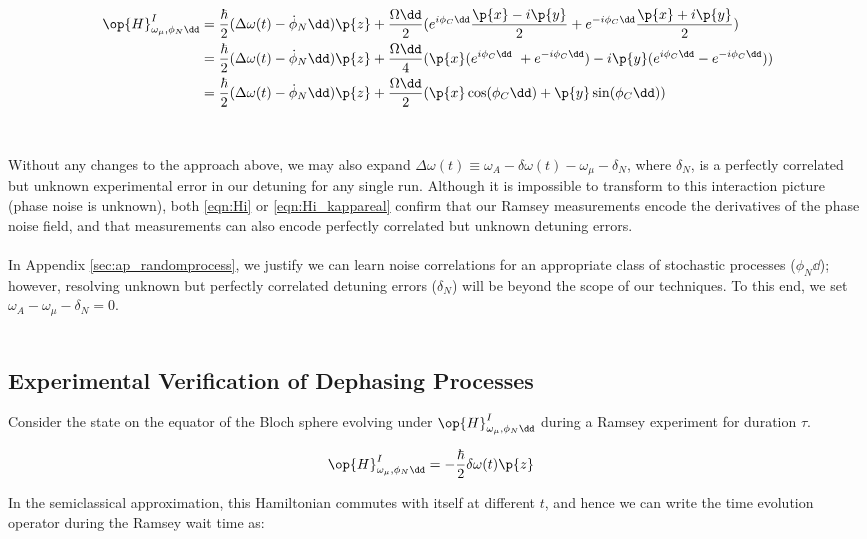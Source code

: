\begin{align}
\op{H}^{I}_{\omega_\mu,\phi_N\dd} & = \frac{\hbar}{2}(\Delta \omega(t)- \dot{\phi}_N\dd)\p{z} + \frac{\Omega\dd}{2} (e^{i\phi_C\dd}\frac{\p{x} - i\p{y}}{2} + e^{-i\phi_C\dd}\frac{\p{x} + i\p{y}}{2})\\
& = \frac{\hbar}{2}(\Delta \omega(t)- \dot{\phi}_N\dd)\p{z} + \frac{\Omega\dd}{4} (\p{x} (e^{i\phi_C\dd}\ +  e^{-i\phi_C\dd})- i\p{y} ( e^{i\phi_C\dd} - e^{-i\phi_C\dd} ))\\
& = \frac{\hbar}{2}(\Delta \omega(t)- \dot{\phi}_N\dd)\p{z} + \frac{\Omega\dd}{2} (\p{x} \cos(\phi_C\dd) + \p{y} \sin(\phi_C\dd)) \label{eqn:Hi_kappareal}
\end{align}
\\
\\
Without any changes to the approach above, we may also expand $\Delta \omega(t) \equiv \omega_A - \delta \omega(t)-\omega_\mu -\delta_N$, where $\delta_N$, is a perfectly correlated but unknown experimental error in our detuning for any single run. Although it is impossible to transform to this interaction picture (phase noise is unknown), both \ref{eqn:Hi} or \ref{eqn:Hi_kappareal} confirm that our Ramsey measurements encode the derivatives of the phase noise field, and that measurements can also encode perfectly correlated but unknown detuning errors.
\\
\\
In Appendix \ref{sec:ap_randomprocess}, we justify we can learn noise correlations for an appropriate class of stochastic processes ($\phi_N\dd$); however, resolving unknown but perfectly correlated detuning errors ($\delta_N$) will be beyond the scope of our techniques. To this end, we set $\omega_A - \omega_\mu - \delta_N = 0$.
\\
\\
\subsection{Experimental Verification of Dephasing Processes} \label{sec:ap_setup:subsec:RamseyMeasurement}

Consider the state on the equator of the Bloch sphere evolving under $\op{H}^{I}_{\omega_\mu,\phi_N\dd}$ during a Ramsey experiment for duration $\tau$. 

\begin{align}
\op{H}^{I}_{\omega_\mu,\phi_N\dd} & = -\frac{\hbar}{2}\delta\omega(t)\p{z}
\end{align}

In the semiclassical approximation, this Hamiltonian commutes with itself at different $t$, and hence we can write the time evolution operator during the Ramsey wait time as:

